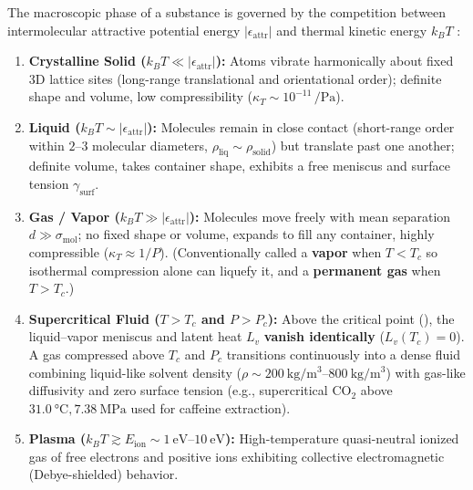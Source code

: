 The macroscopic phase of a substance is governed by the competition between intermolecular attractive potential energy $|\epsilon_{\mathrm{attr}}|$ and thermal kinetic energy $k_B T$ :
\begin{enumerate}
  \item \textbf{Crystalline Solid ($k_B T \ll |\epsilon_{\mathrm{attr}}|$):} Atoms vibrate harmonically about fixed 3D lattice sites (long-range translational and orientational order); definite shape and volume, low compressibility ($\kappa_T \sim 10^{-11}\,\si{\per\pascal}$).
  \item \textbf{Liquid ($k_B T \sim |\epsilon_{\mathrm{attr}}|$):} Molecules remain in close contact (short-range order within $2\text{--}3$ molecular diameters, $\rho_{\mathrm{liq}} \sim \rho_{\mathrm{solid}}$) but translate past one another; definite volume, takes container shape, exhibits a free meniscus and surface tension $\gamma_{\mathrm{surf}}$.
  \item \textbf{Gas / Vapor ($k_B T \gg |\epsilon_{\mathrm{attr}}|$):} Molecules move freely with mean separation $d \gg \sigma_{\mathrm{mol}}$; no fixed shape or volume, expands to fill any container, highly compressible ($\kappa_T \approx 1/P$). (Conventionally called a \textbf{vapor} when $T < T_c$ so isothermal compression alone can liquefy it, and a \textbf{permanent gas} when $T > T_c$.)
  \item \textbf{Supercritical Fluid ($T > T_c$ and $P > P_c$):} Above the critical point (), the liquid--vapor meniscus and latent heat $L_v$ \textbf{vanish identically} ($L_v(T_c) = 0$). A gas compressed above $T_c$ and $P_c$ transitions continuously into a dense fluid combining liquid-like solvent density ($\rho \sim \SIrange{200}{800}{\kilogram\per\cubic\meter}$) with gas-like diffusivity and zero surface tension (e.g., supercritical $\mathrm{CO_2}$ above $\SI{31.0}{\celsius}, \SI{7.38}{\mega\pascal}$ used for caffeine extraction).
  \item \textbf{Plasma ($k_B T \gtrsim E_{\mathrm{ion}} \sim \SIrange{1}{10}{\electronvolt}$):} High-temperature quasi-neutral ionized gas of free electrons and positive ions exhibiting collective electromagnetic (Debye-shielded) behavior.
\end{enumerate}

